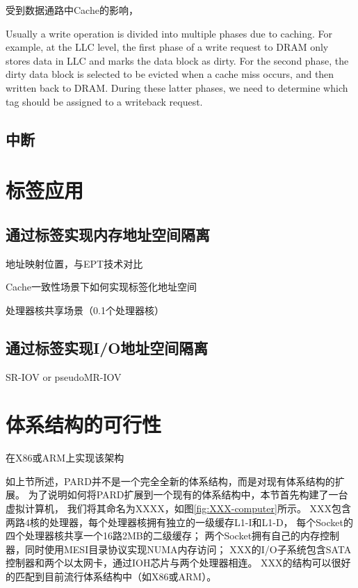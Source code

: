 受到数据通路中Cache的影响，

Usually a write operation
is divided into multiple phases due to caching. For example,
at the LLC level, the first phase of a write request to DRAM only
stores data in LLC and marks the data block as dirty. For the second
phase, the dirty data block is selected to be evicted when a cache
miss occurs, and then written back to DRAM. During these latter
phases, we need to determine which tag should be assigned to a
writeback request.


\subsection{中断}


\section{标签应用}

\subsection{通过标签实现内存地址空间隔离}

地址映射位置，与EPT技术对比

Cache一致性场景下如何实现标签化地址空间

处理器核共享场景（0.1个处理器核）

\subsection{通过标签实现I/O地址空间隔离}

SR-IOV or pseudoMR-IOV





\section{体系结构的可行性}

在X86或ARM上实现该架构


如上节所述，PARD并不是一个完全全新的体系结构，而是对现有体系结构的扩展。
为了说明如何将PARD扩展到一个现有的体系结构中，本节首先构建了一台虚拟计算机，
我们将其命名为XXXX，如图\ref{fig:XXX-computer}所示。
XXX包含两路4核的处理器，每个处理器核拥有独立的一级缓存L1-I和L1-D，
每个Socket的四个处理器核共享一个16路2MB的二级缓存；
两个Socket拥有自己的内存控制器，同时使用MESI目录协议实现NUMA内存访问；
XXX的I/O子系统包含SATA控制器和两个以太网卡，通过IOH芯片与两个处理器相连。
XXX的结构可以很好的匹配到目前流行体系结构中（如X86或ARM）。

